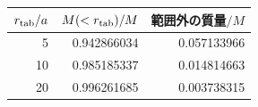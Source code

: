\begin{tabular}{rrr}\toprule
$r_{\rm tab}/a$ & $M(<r_{\rm tab})/M$ & 範囲外の質量$/M$ \\
\midrule
5 & 0.942866034 & 0.057133966 \\
10 & 0.985185337 & 0.014814663 \\
20 & 0.996261685 & 0.003738315 \\
\bottomrule\end{tabular}
